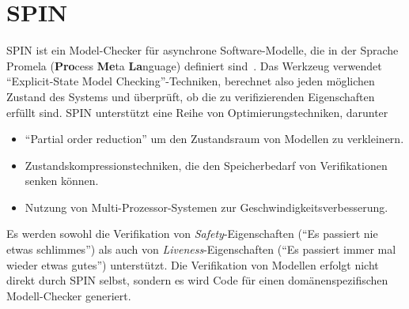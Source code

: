 \section{SPIN}
SPIN ist ein Model-Checker für asynchrone Software-Modelle, die in der Sprache Promela ({\bf Pro}cess {\bf Me}ta {\bf La}nguage) definiert sind~\cite{spinbook}.
Das Werkzeug verwendet "`Explicit-State Model Checking"'-Techniken, berechnet also jeden möglichen Zustand des Systems und überprüft, ob die zu verifizierenden Eigenschaften erfüllt sind.
SPIN unterstützt eine Reihe von Optimierungstechniken, darunter
\begin{itemize}
\item "`Partial order reduction"' um den Zustandsraum von Modellen zu verkleinern.
\item Zustandskompressionstechniken, die den Speicherbedarf von Verifikationen senken können.
\item Nutzung von Multi-Prozessor-Systemen zur Geschwindigkeitsverbesserung.
\end{itemize}
Es werden sowohl die Verifikation von \emph{Safety}-Eigenschaften ("`Es passiert nie etwas schlimmes"') als auch von \emph{Liveness}-Eigenschaften ("`Es passiert immer mal wieder etwas gutes"') unterstützt.
Die Verifikation von Modellen erfolgt nicht direkt durch SPIN selbst, sondern es wird Code für einen domänenspezifischen Modell-Checker generiert.